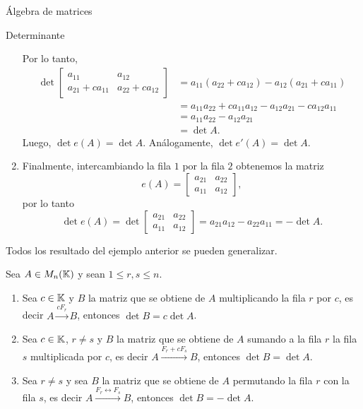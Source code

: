 \begin{chapter}{\'Algebra de matrices}
\begin{section}{Determinante}
\begin{ejemplo*}
\begin{enumerate}
\begin{equation*}
            \end{equation*}
            Por lo tanto, 
            \begin{align*}
                \det \begin{bmatrix} a_{11}& a_{12}\\ a_{21}+ ca_{11}&a_{22}+ ca_{12}\end{bmatrix} &=
                a_{11}(a_{22}+ ca_{12})- a_{12}( a_{21}+ ca_{11}) \\
                &= a_{11}a_{22}+ ca_{11}a_{12}- a_{12} a_{21}- ca_{12} a_{11}\\
                &= a_{11}a_{22}- a_{12} a_{21} \\
                &= \det A.
            \end{align*}
            Luego,  $\det e(A) = \det A$. Análogamente,   $\det e'(A) = \det A$. 
            \item Finalmente, intercambiando la fila $1$ por la fila $2$ obtenemos la matriz
            \begin{equation*}
            e(A)=\begin{bmatrix} a_{21}& a_{22}\\ a_{11}&a_{12}\end{bmatrix},
            \end{equation*}
            por lo tanto 
            \begin{equation*}
            \det e(A)= \det \begin{bmatrix} a_{21}& a_{22}\\ a_{11}&a_{12}\end{bmatrix} = a_{21}a_{12} - a_{22}a_{11} = -\det A.
            \end{equation*}
        \end{enumerate}
    \end{ejemplo*}
    
    Todos los resultado del ejemplo anterior se pueden generalizar. 
    
    \begin{teorema} \label{det-prop-fundamentales}
        Sea $A  \in M_n(\mathbb K)$ y sean $1 \le r,s \le n$.
        \begin{enumerate}
            \item\label{det-prop-fundamentales-1} Sea $c \in \mathbb K$ y $B$ la matriz que se obtiene de $A$ multiplicando la fila $r$ por $c$, es decir $A  \stackrel{cF_r}{\longrightarrow} B$, entonces $\det B = c \det A$.
            \item \label{det-prop-fundamentales-2} Sea $c \in \mathbb K$, $r \ne s$ y $B$ la matriz que se obtiene de $A$ sumando a la fila $r$ la fila $s$ multiplicada por $c$, es decir  $A  \stackrel{F_r + cF_s}{\longrightarrow} B$, entonces $\det B = \det A$.
            \item\label{det-prop-fundamentales-3} Sea $r \ne s$ y sea $B$ la matriz que se obtiene de $A$ permutando la fila $r$ con la fila $s$, es decir  $A  \stackrel{F_r \leftrightarrow F_s}{\longrightarrow}B$, entonces $\det B = -\det A$.
            

\end{enumerate}
\end{teorema}
\end{section}
\end{chapter}

